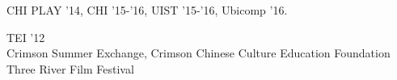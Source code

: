  {
	 {
		CHI PLAY '14, CHI '15-'16, UIST '15-'16, Ubicomp '16.
	}
}

 {
	 {
		TEI '12\\
		Crimson Summer Exchange, Crimson Chinese Culture Education Foundation\\
		Three River Film Festival
	}
}